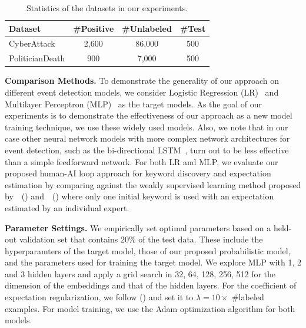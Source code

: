 \documentclass[letterpaper]{article}
\begin{document}
\begin{table}[!t]
\centering
\small
\caption{Statistics of the datasets in our experiments.}\label{tab:stats}
\begin{tabular}{lccc}
\toprule
\textbf{Dataset} & \textbf{\#Positive} & \textbf{\#Unlabeled} & \textbf{\#Test} \\
\midrule
CyberAttack  & 2,600 & 86,000 & 500 \\
PoliticianDeath & 900  & 7,000 & 500\\
\bottomrule
\end{tabular}
\end{table}







\smallskip
\noindent\textbf{Comparison Methods.} To demonstrate the generality of our approach on different event detection models, we consider Logistic Regression (LR)~\cite{ritter2015weakly} and Multilayer Perceptron (MLP)~\cite{chambers2018detecting} %
as the target models. As the goal of our experiments is to demonstrate the effectiveness of our approach as a new model training technique, we use these widely used models. Also, we note that in our case other neural network models with more complex network architectures for event detection, such as the bi-directional LSTM~\cite{chang2016expectation}, turn out to be less effective than a simple feedforward network. For both LR and MLP, we evaluate our proposed human-AI loop approach for keyword discovery and expectation estimation by comparing against the weakly supervised learning method proposed by~\citeauthor{ritter2015weakly}~(\citeyear{ritter2015weakly}) and~\citeauthor{chang2016expectation}~(\citeyear{chang2016expectation}) where only one initial keyword is used with an expectation estimated by an individual expert.

\smallskip
\noindent\textbf{Parameter Settings.} We empirically set optimal parameters based on a held-out validation set that contains 20\% of the test data. These include the hyperparamters of the target model, those of our proposed probabilistic model, and the parameters used for training the target model. We explore MLP with 1, 2 and 3 hidden layers and apply a grid search in {32, 64, 128, 256, 512} for the dimension of the embeddings and that of the hidden layers. %
For the coefficient of expectation regularization, we follow \citeauthor{mann2007simple} (\citeyear{mann2007simple}) and set it to $\lambda=10 \times$ \#labeled examples. %
For model training, we use the Adam \cite{kingma2014adam} optimization algorithm for both models.
\end{document}

